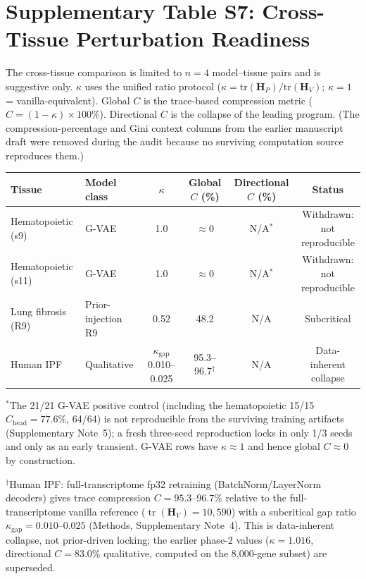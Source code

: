 \documentclass[11pt,a4paper]{article}
\newcommand{\Hmat}{\mathbf{H}}\newcommand{\trloss}{\operatorname{tr}}
\begin{document}
\section*{Supplementary Table S7: Cross-Tissue Perturbation Readiness}
\label{tab:s7_cross_tissue}

The cross-tissue comparison is limited to $n=4$ model--tissue pairs and is suggestive only. $\kappa$ uses the unified ratio protocol ($\kappa=\mathrm{tr}(\mathbf{H}_P)/\mathrm{tr}(\mathbf{H}_V)$; $\kappa=1$ = vanilla-equivalent). Global $C$ is the trace-based compression metric ($C=(1-\kappa)\times100\%$). Directional $C$ is the collapse of the leading program. (The compression-percentage and Gini context columns from the earlier manuscript draft were removed during the audit because no surviving computation source reproduces them.)

\begin{center}
\begin{tabular}{@{}llcccc@{}}
\toprule
\textbf{Tissue} & \textbf{Model class} & \textbf{$\kappa$} & \textbf{Global $C$ (\%)} & \textbf{Directional $C$ (\%)} & \textbf{Status} \\
\midrule
Hematopoietic (s9)  & G-VAE & 1.0 & $\approx0$ & N/A$^*$ & \shortstack{Withdrawn:\\not reproducible} \\
Hematopoietic (s11) & G-VAE & 1.0 & $\approx0$ & N/A$^*$ & \shortstack{Withdrawn:\\not reproducible} \\
Lung fibrosis (R9)   & Prior-injection R9 & 0.52 & 48.2 & N/A & Subcritical \\
Human IPF           & Qualitative & $\kappa_{\mathrm{gap}}$ 0.010--0.025 & 95.3--96.7$^{\dagger}$ & N/A & \shortstack{Data-inherent\\collapse} \\
\bottomrule
\end{tabular}
\end{center}

$^*$The 21/21 G-VAE positive control (including the hematopoietic 15/15 $C_{\text{head}}=77.6\%$, 64/64) is not reproducible from the surviving training artifacts (Supplementary Note~5); a fresh three-seed reproduction locks in only 1/3 seeds and only as an early transient. G-VAE rows have $\kappa\approx1$ and hence global $C\approx0$ by construction.

$^{\dagger}$Human IPF: full-transcriptome fp32 retraining (BatchNorm/LayerNorm decoders) gives trace compression $C=95.3$--$96.7\%$ relative to the full-transcriptome vanilla reference ($\trloss(\Hmat_V)=10{,}590$) with a subcritical gap ratio $\kappa_{\mathrm{gap}}=0.010$--$0.025$ (Methods, Supplementary Note~4). This is data-inherent collapse, not prior-driven locking; the earlier phase-2 values ($\kappa=1.016$, directional $C=83.0\%$ qualitative, computed on the 8,000-gene subset) are superseded.
\end{document}
